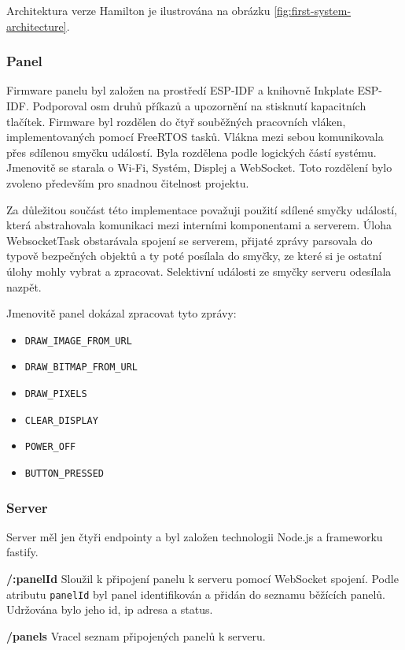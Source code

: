 Architektura verze Hamilton je ilustrována na obrázku \ref{fig:first-system-architecture}.

\subsubsection{Panel}
Firmware panelu byl založen na prostředí ESP-IDF a knihovně Inkplate ESP-IDF. Podporoval osm druhů příkazů a upozornění na stisknutí kapacitních tlačítek. Firmware byl rozdělen do čtyř souběžných pracovních vláken, implementovaných pomocí FreeRTOS tasků. Vlákna mezi sebou komunikovala přes sdílenou smyčku událostí. Byla rozdělena podle logických částí systému. Jmenovitě se starala o Wi-Fi, Systém, Displej a WebSocket. Toto rozdělení bylo zvoleno především pro snadnou čitelnost projektu.

Za důležitou součást této implementace považuji použití sdílené smyčky událostí, která abstrahovala komunikaci mezi interními komponentami a serverem. Úloha WebsocketTask obstarávala spojení se serverem, přijaté zprávy parsovala do typově bezpečných objektů a ty poté posílala do smyčky, ze které si je ostatní úlohy mohly vybrat a zpracovat. Selektivní události ze smyčky serveru odesílala nazpět.

Jmenovitě panel dokázal zpracovat tyto zprávy:

\begin{itemize}
    \item \verb|DRAW_IMAGE_FROM_URL|
    \item \verb|DRAW_BITMAP_FROM_URL|
    \item \verb|DRAW_PIXELS|
    \item \verb|CLEAR_DISPLAY|
    \item \verb|POWER_OFF|
    \item \verb|BUTTON_PRESSED|
\end{itemize}

\subsubsection{Server}
Server měl jen čtyři endpointy a byl založen technologii Node.js a frameworku fastify.

\textbf{/:panelId} Sloužil k připojení panelu k serveru pomocí WebSocket spojení. Podle atributu \lstinline{panelId} byl panel identifikován a přidán do seznamu běžících panelů. Udržována bylo jeho id, ip adresa a status.

\textbf{/panels} Vracel seznam připojených panelů k serveru.

